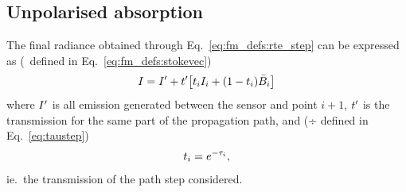 \subsection{Unpolarised absorption}
\label{sec:wfuns:atmvars:unpol}
%
The final radiance obtained through Eq.~\ref{eq:fm_defs:rte_step} can be
expressed as (\StoI\ defined in Eq.~\ref{eq:fm_defs:stokevec})
\begin{equation}
  \label{eq:I4J}
  I = I'+ t'\!\left[ t_{i}I_{i} +
                                (1-t_{i})\bar{B}_i \right]
\end{equation}
where $I'$ is all emission generated between the sensor and point $i+1$,
$t'$ is the transmission for the same part of the propagation path, and
(÷ defined in Eq.~\ref{eq:taustep})
\begin{equation}
  t_{i} = e^{-\tau_{i}},
\end{equation}
ie.\ the transmission of the path step considered.


